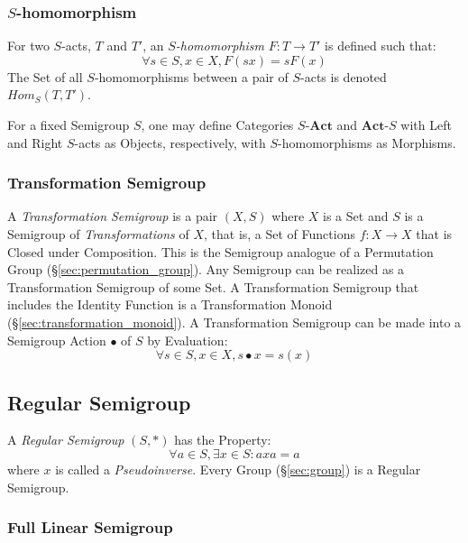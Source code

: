 \subsubsection{$S$-homomorphism}\label{sec:s_homomorphism}

For two $S$-acts, $T$ and $T'$, an \emph{$S$-homomorphism} $F : T
\rightarrow T'$ is defined such that:
\[
  \forall s \in S, x \in X, F(sx) = sF(x)
\]
The Set of all $S$-homomorphisms between a pair of $S$-acts is denoted
$Hom_S(T,T')$.

For a fixed Semigroup $S$, one may define Categories
$S\text{-}\mathbf{Act}$ and $\mathbf{Act}\text{-}S$ with Left and
Right $S$-acts as Objects, respectively, with $S$-homomorphisms as
Morphisms.



\subsubsection{Transformation Semigroup}\label{sec:transformation_semigroup}

A \emph{Transformation Semigroup} is a pair $(X,S)$ where $X$ is a Set
and $S$ is a Semigroup of \emph{Transformations} of $X$, that is, a
Set of Functions $f : X \rightarrow X$ that is Closed under
Composition. This is the Semigroup analogue of a Permutation Group
(\S\ref{sec:permutation_group}). Any Semigroup can be realized as a
Transformation Semigroup of some Set. A Transformation Semigroup that
includes the Identity Function is a Transformation Monoid
(\S\ref{sec:transformation_monoid}). A Transformation Semigroup can be
made into a Semigroup Action $\bullet$ of $S$ by Evaluation:
\[
  \forall s \in S, x \in X, s \bullet x = s(x)
\]



\subsection{Regular Semigroup}\label{sec:regular_semigroup}

A \emph{Regular Semigroup} $(S,*)$ has the Property:
\[
  \forall a \in S, \exists x \in S : axa = a
\]
where $x$ is called a \emph{Pseudoinverse}. Every Group
(\S\ref{sec:group}) is a Regular Semigroup.



\subsubsection{Full Linear Semigroup}\label{sec:full_linear_semigroup}

